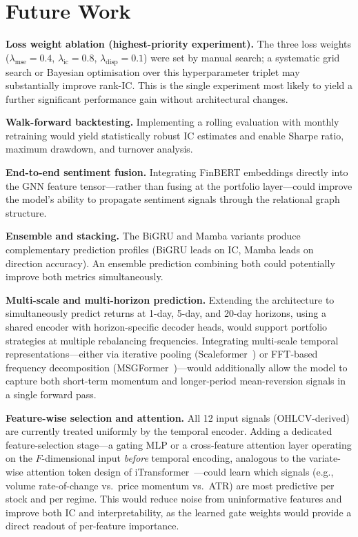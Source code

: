 \documentclass[a4paper,11pt]{report}
\begin{document}
\section{Future Work}

\textbf{Loss weight ablation (highest-priority experiment).} The three loss weights ($\lambda_{\text{mse}}=0.4$, $\lambda_{\text{ic}}=0.8$, $\lambda_{\text{disp}}=0.1$) were set by manual search; a systematic grid search or Bayesian optimisation over this hyperparameter triplet may substantially improve rank-IC. This is the single experiment most likely to yield a further significant performance gain without architectural changes.

\textbf{Walk-forward backtesting.} Implementing a rolling evaluation with monthly retraining would yield statistically robust IC estimates and enable Sharpe ratio, maximum drawdown, and turnover analysis.

\textbf{End-to-end sentiment fusion.} Integrating FinBERT embeddings directly into the GNN feature tensor---rather than fusing at the portfolio layer---could improve the model's ability to propagate sentiment signals through the relational graph structure.

\textbf{Ensemble and stacking.} The BiGRU and Mamba variants produce complementary prediction profiles (BiGRU leads on IC, Mamba leads on direction accuracy). An ensemble prediction combining both could potentially improve both metrics simultaneously.

\textbf{Multi-scale and multi-horizon prediction.} Extending the architecture to simultaneously predict returns at 1-day, 5-day, and 20-day horizons, using a shared encoder with horizon-specific decoder heads, would support portfolio strategies at multiple rebalancing frequencies. Integrating multi-scale temporal representations---either via iterative pooling (Scaleformer~\cite{shabani2023scaleformer}) or FFT-based frequency decomposition (MSGFormer~\cite{zhu2025msgformer})---would additionally allow the model to capture both short-term momentum and longer-period mean-reversion signals in a single forward pass.


\textbf{Feature-wise selection and attention.} All 12 input signals (OHLCV-derived) are currently treated uniformly by the temporal encoder. Adding a dedicated feature-selection stage---a gating MLP or a cross-feature attention layer operating on the $F$-dimensional input \emph{before} temporal encoding, analogous to the variate-wise attention token design of iTransformer~\cite{liu2024itransformer}---could learn which signals (e.g., volume rate-of-change vs.\ price momentum vs.\ ATR) are most predictive per stock and per regime. This would reduce noise from uninformative features and improve both IC and interpretability, as the learned gate weights would provide a direct readout of per-feature importance.
\end{document}

